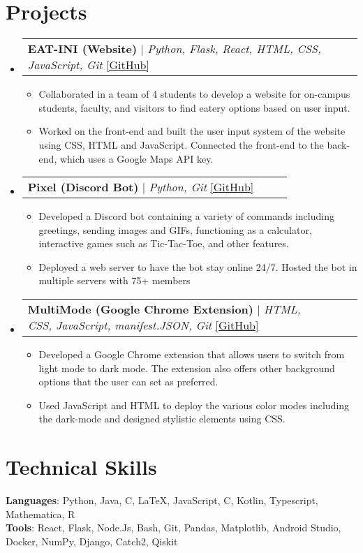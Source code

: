 \documentclass[letterpaper,11pt]{article}
\makeatletter
\newcommand{\resumeItem}[1]{
  \item\small{
    {#1 \vspace{-3pt}}
  }
}
\newcommand{\CC}{C\nolinebreak\hspace{-.05em}\raisebox{.4ex}{\tiny\bf +}\nolinebreak\hspace{-.10em}\raisebox{.4ex}{\tiny\bf +}}
\def\CC{{C\nolinebreak[4]\hspace{-.05em}\raisebox{.4ex}{\tiny\bf ++}}}
\newcommand{\resumeProjectHeading}[2]{
    \item
    \begin{tabular*}{0.97\textwidth}{l@{\extracolsep{\fill}}r}
      \small#1 & #2 \\
    \end{tabular*}\vspace{-7pt}
}
\newcommand{\resumeSubHeadingListStart}{\begin{itemize}[leftmargin=0.15in, label={}]}
\newcommand{\resumeSubHeadingListEnd}{\end{itemize}}
\newcommand{\resumeItemListStart}{\begin{itemize}}
\newcommand{\resumeItemListEnd}{\end{itemize}\vspace{-5pt}}
\makeatother
\begin{document}
\section{Projects}
    \resumeSubHeadingListStart
      \resumeProjectHeading
          {\textbf{EAT-INI (Website)} $|$ \emph{Python, Flask, React, HTML, CSS, JavaScript, Git} \href{https://github.com/CS196Illinois/Group1-SP22}{\color{blue}[GitHub]}}{~~~}
          \resumeItemListStart
            \resumeItem{Collaborated in a team of 4 students to develop a website for on-campus students, faculty, and visitors to find eatery options based on user input.} 
            \resumeItem{Worked on the front-end and built the user input system of the website using CSS, HTML and JavaScript. Connected the front-end to the back-end, which uses a Google Maps API key.}
          \resumeItemListEnd
      \resumeProjectHeading
          {\textbf{Pixel (Discord Bot)} $|$ \emph{Python, Git} \href{https://github.com/RamGoenka/pixel}{\color{blue}[GitHub]}}{~~~}
          \resumeItemListStart
            \resumeItem{Developed a Discord bot containing a variety of commands including greetings, sending images and GIFs, functioning as a calculator, interactive games such as Tic-Tac-Toe, and other features.}
            \resumeItem{Deployed a web server to have the bot stay online 24/7. Hosted the bot in multiple servers with 75+ members}
            
          \resumeItemListEnd
        \resumeProjectHeading
          {\textbf{MultiMode (Google Chrome Extension)} $|$ \emph{HTML, CSS, JavaScript, manifest.JSON, Git} \href{https://github.com/RamGoenka/MutliMode}{\color{blue}[GitHub]}}{~~~}
          \resumeItemListStart
            \resumeItem{Developed a Google Chrome extension that allows users to switch from light mode to dark mode. The extension also offers other background options that the user can set as preferred.}
            \resumeItem{Used JavaScript and HTML to deploy the various color modes including the dark-mode and designed stylistic elements using CSS.}
            \resumeItemListEnd
    \resumeSubHeadingListEnd
\section{Technical Skills}
 \begin{itemize}[leftmargin=0.10in, label={}]
    \small{\item{
     \textbf{Languages}{: Python, Java, \CC, \LaTeX, JavaScript, C, Kotlin, Typescript, Mathematica, R} \\
     \textbf{Tools}{: React, Flask, Node.Js, Bash, Git, Pandas, Matplotlib, Android Studio, Docker, NumPy, Django, Catch2, Qiskit} 
    }}
 \end{itemize}
\end{document}

